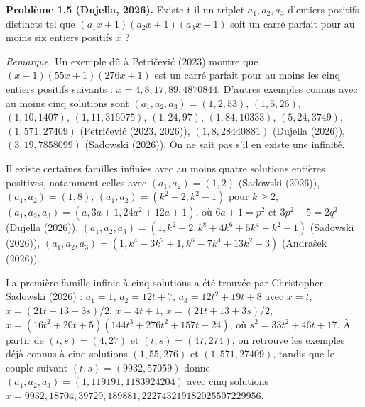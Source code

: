 \textbf{Problème 1.5 (Dujella, 2026).} Existe-t-il un triplet $a_1, a_2, a_3$ d'entiers positifs distincts tel que $(a_1x+1)(a_2x+1)(a_3x+1)$ soit un carré parfait pour au moins six entiers positifs $x$ ?

\medskip

\textit{Remarque.} Un exemple dû à Petričević (2023) montre que $(x+1)(55x+1)(276x+1)$ est un carré parfait pour au moins les cinq entiers positifs suivants : $x = 4, 8, 17, 89, 4870844$. D'autres exemples connus avec au moins cinq solutions sont $(a_1,a_2,a_3) = (1,2,53)$, $(1,5,26)$, $(1,10,1407)$, $(1,11,316075)$, $(1,24,97)$, $(1,84,10333)$, $(5,24,3749)$, $(1,571,27409)$ (Petričević (2023, 2026)), $(1,8,28440881)$ (Dujella (2026)), $(3,19,7858099)$ (Sadowski (2026)). On ne sait pas s'il en existe une infinité.

Il existe certaines familles infinies avec au moins quatre solutions entières positives, notamment celles avec $(a_1,a_2) = (1,2)$ (Sadowski (2026)), $(a_1,a_2) = (1,8)$, $(a_1,a_2) = (k^2-2, k^2-1)$ pour $k \geqslant 2$, $(a_1,a_2,a_3) = (a, 3a+1, 24a^2+12a+1)$, où $6a+1 = p^2$ et $3p^2+5 = 2q^2$ (Dujella (2026)), $(a_1,a_2,a_3) = (1, k^2+2, k^8+4k^6+5k^4+k^2-1)$ (Sadowski (2026)), $(a_1,a_2,a_3) = (1, k^4-3k^2+1, k^6-7k^4+13k^2-3)$ (Andrašek (2026)).

La première famille infinie à cinq solutions a été trouvée par Christopher Sadowski (2026) : $a_1=1$, $a_2=12t+7$, $a_3=12t^2+19t+8$ avec $x=t$, $x=(21t+13-3s)/2$, $x=4t+1$, $x=(21t+13+3s)/2$, $x=(16t^2+20t+5)(144t^3+276t^2+157t+24)$, où $s^2 = 33t^2+46t+17$. À partir de $(t,s)=(4,27)$ et $(t,s)=(47,274)$, on retrouve les exemples déjà connus à cinq solutions $(1,55,276)$ et $(1,571,27409)$, tandis que le couple suivant $(t,s)=(9932,57059)$ donne $(a_1,a_2,a_3)=(1,119191,1183924204)$ avec cinq solutions $x = 9932, 18704, 39729, 189881, 222743219182025507229956$.
